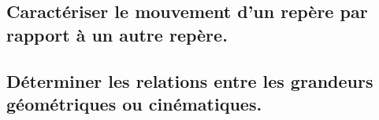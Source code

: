 \documentclass[10pt,fleqn]{article}
\newcommand{\repRel}{../..}
\newcommand{\repStyle}{\repRel/Style}
\newcommand{\td}{fichier_td}
\newcommand{\repExos}{\repRel/ExercicesCompetences}
\newcommand{\repExo}{dossier}
\begin{document}
\begin{multicols}{2} 

\renewcommand{\repExo}{\repExos/C2_MettreEnOeuvreDemarche/C2_04_Correcteurs/65_Eclipse}
\renewcommand{\td}{65_Eclipse}
\graphicspath{{\repStyle/png/}{\repExo/images/}}


\renewcommand{\repExo}{\repExos/C2_MettreEnOeuvreDemarche/C2_04_Correcteurs/65_Eclipse_02}
\renewcommand{\td}{65_Eclipse_02}
\graphicspath{{\repStyle/png/}{\repExo/images/}}


\renewcommand{\repExo}{\repExos/C2_MettreEnOeuvreDemarche/C2_04_Correcteurs/65_Eclipse_03}
\renewcommand{\td}{65_Eclipse_03}
\graphicspath{{\repStyle/png/}{\repExo/images/}}


\renewcommand{\repExo}{\repExos/C2_MettreEnOeuvreDemarche/C2_04_Correcteurs/66_Micromanipulateur}
\renewcommand{\td}{66_Micromanipulateur}
\graphicspath{{\repStyle/png/}{\repExo/images/}}


\renewcommand{\repExo}{\repExos/C2_MettreEnOeuvreDemarche/C2_04_Correcteurs/67_PompeTurbo}
\renewcommand{\td}{67_PompeTurbo}
\graphicspath{{\repStyle/png/}{\repExo/images/}}


\renewcommand{\repExo}{\repExos/C2_MettreEnOeuvreDemarche/C2_04_Correcteurs/68_Roburoc}
\renewcommand{\td}{68_Roburoc}
\graphicspath{{\repStyle/png/}{\repExo/images/}}


\renewcommand{\repExo}{\repExos/C2_MettreEnOeuvreDemarche/C2_04_Correcteurs/70_Hublex}
\renewcommand{\td}{70_Hublex}
\graphicspath{{\repStyle/png/}{\repExo/images/}}


\end{multicols}

\subsection{Caractériser le mouvement d’un repère par rapport à un autre repère.} 

\begin{multicols}{2} 

\end{multicols}

\subsection{Déterminer les relations entre les grandeurs géométriques ou cinématiques. } 
\end{document}
